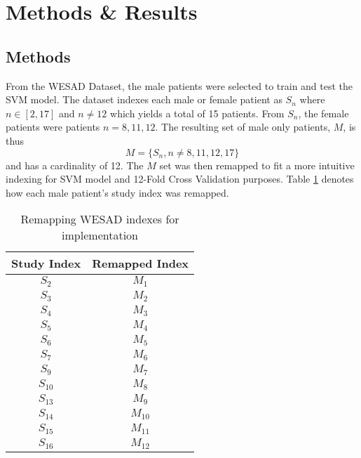 \section{Methods \& Results}
\label{sec:methods-results}

\subsection{Methods}
\label{sec:methods}

From the WESAD Dataset, the male patients were selected to train and test the SVM model. 
The dataset indexes each male or female patient as $S_n$ where $n \in [2,17]$ and 
$n \ne 12$ which yields a total of 15 patients. From $S_n$, the female patients were patients 
$n=8,11,12$. The resulting set of male only patients, $M$, is thus 
$$ M = \{S_n,n \ne 8,11,12,17\} $$
and has a cardinality of 12. The $M$ set was then remapped to fit a more intuitive 
indexing for SVM model and 12-Fold Cross Validation purposes. Table \ref{table:remapping}
denotes how each male patient's study index was remapped. 

\begin{table}[h!]
\centering
\begin{tabular}{||c c||} 
\hline
Study Index & Remapped Index  \\ [0.5ex] 
\hline \hline
$S_2$ & $M_1$  \\ 
\hline
$S_3$ & $M_2$  \\ 
\hline
$S_4$ & $M_3$  \\ 
\hline
$S_5$ & $M_4$  \\ 
\hline
$S_6$ & $M_5$  \\ 
\hline
$S_7$ & $M_6$  \\ 
\hline
$S_9$ & $M_7$  \\ 
\hline
$S_{10}$ & $M_8$  \\ 
\hline
$S_{13}$ & $M_9$  \\ 
\hline
$S_{14}$ & $M_{10}$  \\ 
\hline
$S_{15}$ & $M_{11}$  \\ 
\hline 
$S_{16}$ & $M_{12}$  \\ 
\hline 
\hline
\end{tabular}
\caption{Remapping WESAD indexes for implementation}
\label{table:remapping}
\end{table}

